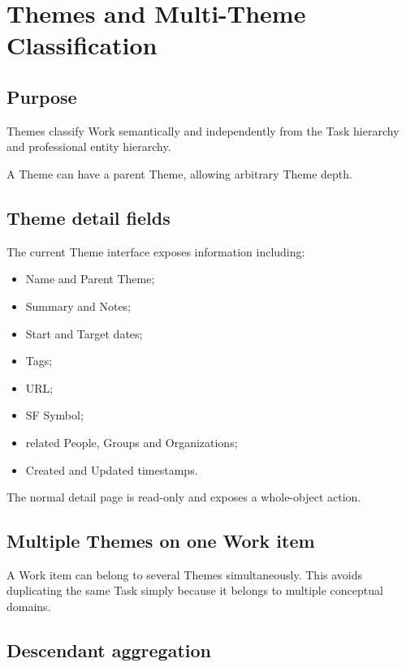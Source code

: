 \documentclass{testudomanual}
\begin{document}
\chapter{Themes and Multi-Theme Classification}

\section{Purpose}

Themes classify Work semantically and independently from the Task hierarchy and professional entity hierarchy.

A Theme can have a parent Theme, allowing arbitrary Theme depth.

\section{Theme detail fields}

The current Theme interface exposes information including:
\begin{itemize}
    \item Name and Parent Theme;
    \item Summary and Notes;
    \item Start and Target dates;
    \item Tags;
    \item URL;
    \item SF Symbol;
    \item related People, Groups and Organizations;
    \item Created and Updated timestamps.
\end{itemize}

The normal detail page is read-only and exposes a whole-object  action.

\section{Multiple Themes on one Work item}

A Work item can belong to several Themes simultaneously. This avoids duplicating the same Task simply because it belongs to multiple conceptual domains.

\section{Descendant aggregation}
\end{document}
